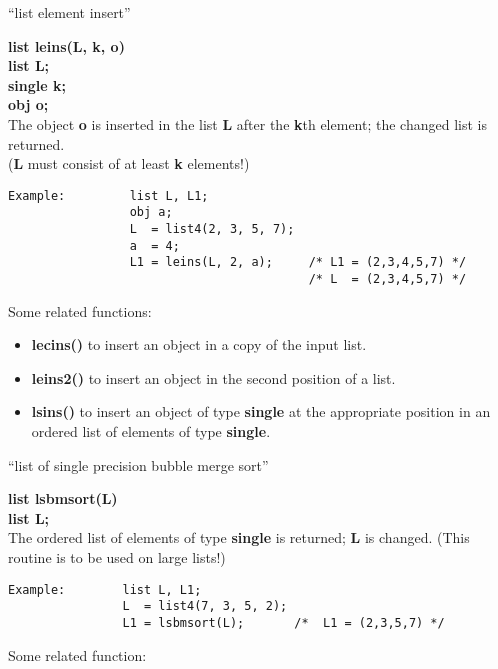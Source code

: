 \leer
\begin{center} ``list element insert'' \end{center}
{\bf list leins(L, k, o)\\
list L;\\
single k;\\
obj o;}\\[2ex]
The object {\bf o} is inserted in the list {\bf L} after the {\bf k}th element; the changed list is
returned.\\
({\bf L} must consist of at least {\bf k} elements!)

\begin{verbatim}
Example:         list L, L1;
                 obj a;
                 L  = list4(2, 3, 5, 7);
                 a  = 4;
                 L1 = leins(L, 2, a);     /* L1 = (2,3,4,5,7) */
                                          /* L  = (2,3,4,5,7) */
\end{verbatim}

Some related functions:

\begin{itemize}
\item[] {\bf lecins()} to insert an object in a copy of the input list.
\item[] {\bf leins2()} to insert an object in the second position of a list.
\item[] {\bf lsins()} to insert an object of type {\bf single} at the appropriate position in an ordered
list of elements of type {\bf single}.
\end{itemize}

\leer
\begin{center} ``list of single precision bubble merge sort'' \end{center}
{\bf list lsbmsort(L)\\
list L;}\\[2ex]
The ordered list of elements of type {\bf single} is returned; {\bf L} is changed.
(This routine is to be used on large lists!)

\begin{verbatim}
Example:        list L, L1;
                L  = list4(7, 3, 5, 2);
                L1 = lsbmsort(L);       /*  L1 = (2,3,5,7) */
\end{verbatim}

Some related function:

